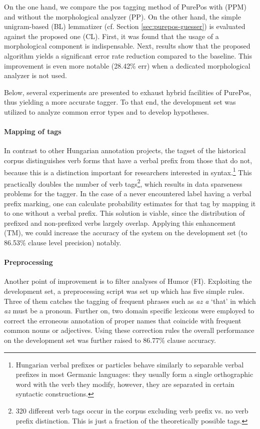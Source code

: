 On the one hand, we compare the \gls{pos} tagging method of PurePos with (PPM) and without the morphological analyzer (PP).
On the other hand, the simple unigram-based (BL) lemmatizer (cf. Section \ref{sec:purepos-guesser}) is evaluated against the proposed one (CL). 
First, it was found that the usage of a morphological component is indispensable. 
Next, results show that the proposed algorithm yields a significant error rate reduction compared to the baseline. 
This improvement is even more notable  (28.42\% \acrshort{err}) when a dedicated morphological analyzer is not used.

Below, several experiments are presented to exhaust hybrid facilities of PurePos, thus yielding a more accurate tagger. 
To that end, the development set was utilized to analyze common error types and to develop hypotheses.

\paragraph{Mapping of tags}

In contrast to other Hungarian annotation projects, the tagset of the historical corpus distinguishes verb forms that have a verbal prefix from those that do not, because this is a distinction important for researchers interested in syntax.\footnote{Hungarian verbal prefixes or particles behave similarly to separable verbal prefixes in most Germanic languages: they usually form a single orthographic word with the verb they modify, however, they are separated in certain syntactic constructions.} 
This practically doubles the number of verb tags\footnote{320 different verb tags occur in the corpus excluding verb prefix vs. no verb prefix distinction. This is just a fraction of the theoretically possible tags.}, which results in data sparseness problems for the tagger. 
In the case of a never encountered label having a verbal prefix marking, one can calculate probability estimates for that tag by mapping it to one without a verbal prefix. 
This solution is viable, since the distribution of prefixed and non-prefixed verbs largely overlap. 
Applying this enhancement (TM), we could increase the accuracy of the system on the development set (to 86.53\% clause level precision) notably.

\paragraph{Preprocessing}

Another point of improvement is to filter analyses of Humor (FI). 
Exploiting the development set, a preprocessing script was set up which has five simple rules. 
Three of them catches the tagging of frequent phrases such as \emph{az a} `that' in which \emph{az} must be a pronoun. 
Further on, two domain specific lexicons were employed to correct the erroneous annotation of proper names that coincide with frequent common nouns or adjectives. 
Using these correction rules the overall performance on the development set was further raised to 86.77\% clause accuracy.


